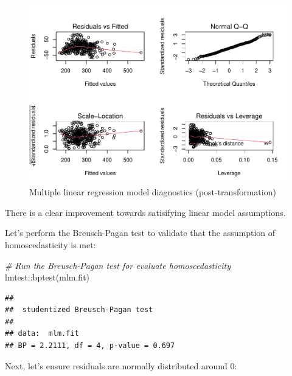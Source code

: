 \documentclass[
]{book}
\newenvironment{Shaded}{\begin{snugshade}}{\end{snugshade}}
\newcommand{\CommentTok}[1]{\textcolor[rgb]{0.56,0.35,0.01}{\textit{#1}}}
\newcommand{\FunctionTok}[1]{\textcolor[rgb]{0.00,0.00,0.00}{#1}}
\newcommand{\NormalTok}[1]{#1}
\newcommand{\SpecialCharTok}[1]{\textcolor[rgb]{0.00,0.00,0.00}{#1}}
\begin{document}
\begin{figure}

{\centering \includegraphics[width=1\linewidth]{The_Fundamentals_of_People_Analytics_files/figure-latex/post-mlm-diagnostics-1} 

}

\caption{Multiple linear regression model diagnostics (post-transformation)}\label{fig:post-mlm-diagnostics}
\end{figure}

There is a clear improvement towards satisifying linear model assumptions.

Let's perform the Breusch-Pagan test to validate that the assumption of homoscedasticity is met:

\begin{Shaded}
\begin{Highlighting}[]
\CommentTok{\# Run the Breusch{-}Pagan test for evaluate homoscedasticity}
\NormalTok{lmtest}\SpecialCharTok{::}\FunctionTok{bptest}\NormalTok{(mlm.fit)}
\end{Highlighting}
\end{Shaded}

\begin{verbatim}
## 
##  studentized Breusch-Pagan test
## 
## data:  mlm.fit
## BP = 2.2111, df = 4, p-value = 0.697
\end{verbatim}

Next, let's ensure residuals are normally distributed around 0:
\end{document}

